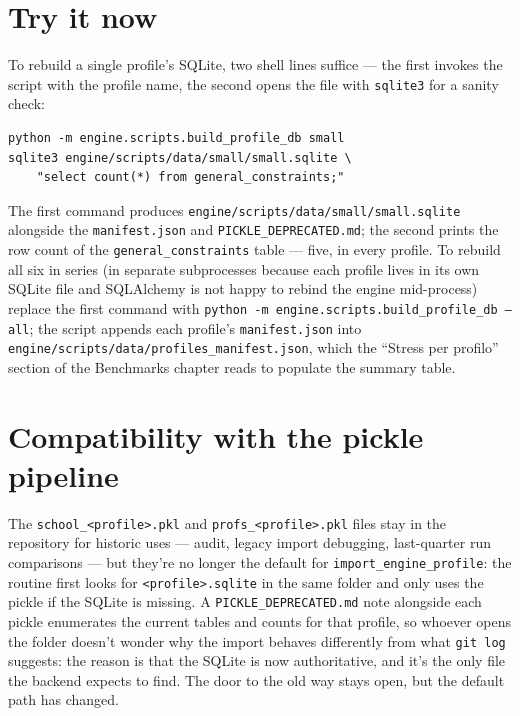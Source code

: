 \section[Try it now]{Try it now}

To rebuild a single profile's SQLite, two shell lines suffice ---
the first invokes the script with the profile name, the second
opens the file with \texttt{sqlite3} for a sanity check:

\begin{lstlisting}[style=shell]
python -m engine.scripts.build_profile_db small
sqlite3 engine/scripts/data/small/small.sqlite \
    "select count(*) from general_constraints;"
\end{lstlisting}

\noindent The first command produces
\texttt{engine/scripts/data/small/small.sqlite} alongside the
\texttt{manifest.json} and \texttt{PICKLE\_DEPRECATED.md}; the
second prints the row count of the \texttt{general\_constraints}
table --- five, in every profile. To rebuild all six in series
(in separate subprocesses because each profile lives in its own
SQLite file and SQLAlchemy is not happy to rebind the engine
mid-process) replace the first command with
\texttt{python -m engine.scripts.build\_profile\_db --all};
the script appends each profile's \texttt{manifest.json} into
\texttt{engine/scripts/data/profiles\_manifest.json}, which the
``Stress per profilo'' section of the Benchmarks chapter reads
to populate the summary table.

\section{Compatibility with the pickle pipeline}

The \texttt{school\_<profile>.pkl} and \texttt{profs\_<profile>.pkl}
files stay in the repository for historic uses --- audit, legacy
import debugging, last-quarter run comparisons --- but they're no
longer the default for \texttt{import\_engine\_profile}: the
routine first looks for \texttt{<profile>.sqlite} in the same
folder and only uses the pickle if the SQLite is missing. A
\texttt{PICKLE\_DEPRECATED.md} note alongside each pickle
enumerates the current tables and counts for that profile, so
whoever opens the folder doesn't wonder why the import behaves
differently from what \texttt{git log} suggests: the reason is
that the SQLite is now authoritative, and it's the only file the
backend expects to find. The door to the old way stays open, but
the default path has changed.
